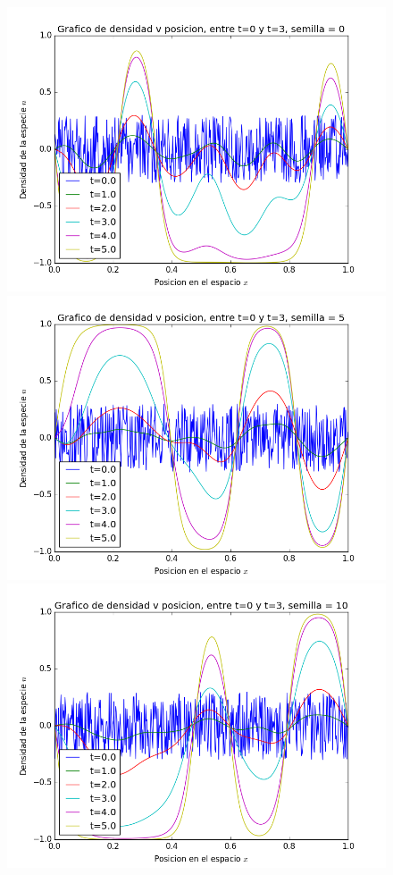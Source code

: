 \documentclass[10pt]{article}
\begin{document}
\begin{figure}[H]
\centering
\includegraphics[scale=0.3]{p_2_0.png}
\includegraphics[scale=0.3]{p_2_5.png}
\includegraphics[scale=0.3]{p_2_10.png}
\end{figure}
\end{document}
